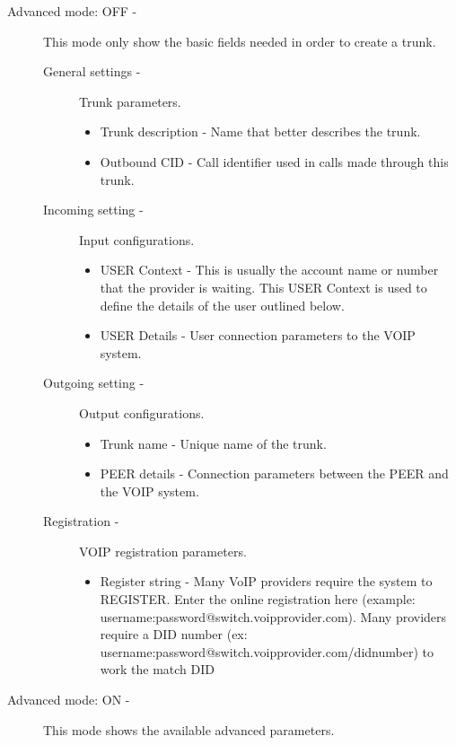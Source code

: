 \begin{description}
	\item[Advanced mode: OFF -] This mode only show the basic fields needed in order to create a trunk.
        \begin{description}
            \item[General settings -] Trunk parameters.
                \begin{itemize}
                    \item Trunk description - Name that better describes the trunk.
                    \item Outbound CID - Call identifier used in calls made through this trunk.
                \end{itemize}

            \item[Incoming setting -] Input configurations.
                \begin{itemize}
                    \item USER Context - This is usually the account name or number that the provider is waiting. This USER Context is used to define the details of the user outlined below.
                    \item USER Details - User connection parameters to the VOIP system.
                \end{itemize}
            \item[Outgoing setting -] Output configurations.
                \begin{itemize}
                    \item Trunk name - Unique name of the trunk.
                    \item PEER details - Connection parameters between the PEER and the VOIP system.
                \end{itemize}
            \item[Registration -] VOIP registration parameters.
                \begin{itemize}
                    \item Register string - Many VoIP providers require the system to REGISTER. Enter the online registration here (example: username:password@switch.voipprovider.com). Many providers require a DID number (ex: username:password@switch.voipprovider.com/didnumber) to work the match DID
                \end{itemize}
        \end{description}
	\item[Advanced mode: ON -] This mode shows the available advanced parameters.

\end{description}
